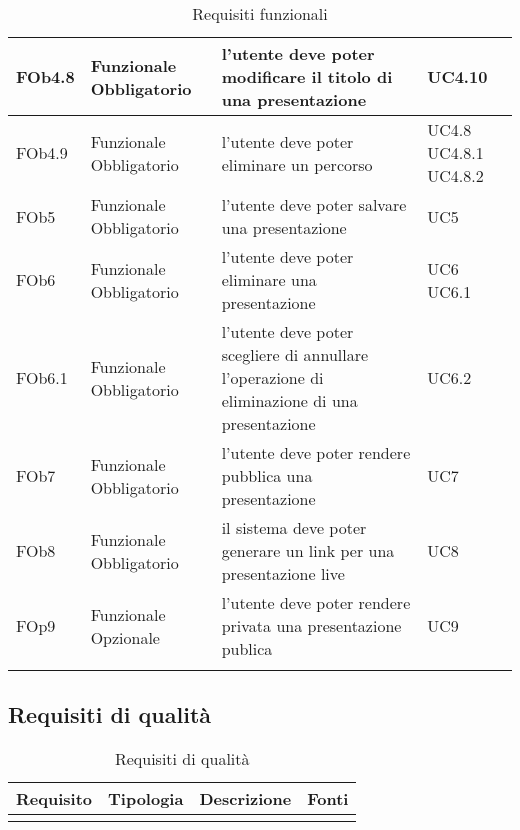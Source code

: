 \begin{longtable}{|l|p{2.5cm}|p{5cm}|p{3.5cm}|}
\hline
FOb4.8 & Funzionale \linebreak Obbligatorio & l'utente deve poter modificare il titolo di una presentazione & UC4.10 \linebreak  \\
\hline
FOb4.9 & Funzionale \linebreak Obbligatorio & l'utente deve poter eliminare un percorso & UC4.8 \linebreak  UC4.8.1 \linebreak  UC4.8.2 \linebreak  \\
\hline
FOb5 & Funzionale \linebreak Obbligatorio & l'utente deve poter salvare una presentazione & UC5 \linebreak \\
\hline
FOb6 & Funzionale \linebreak Obbligatorio & l'utente deve poter eliminare una presentazione & UC6 \linebreak UC6.1 \linebreak \\
\hline
FOb6.1 & Funzionale \linebreak Obbligatorio & l'utente deve poter scegliere di annullare l'operazione di eliminazione di una presentazione & UC6.2 \linebreak  \\
\hline
FOb7 & Funzionale \linebreak Obbligatorio & l'utente deve poter rendere pubblica una presentazione & UC7 \linebreak \\
\hline
FOb8 & Funzionale \linebreak Obbligatorio & il sistema deve poter generare un link per una presentazione live & UC8 \linebreak \\
\hline
FOp9 & Funzionale \linebreak Opzionale & l'utente deve poter rendere privata una presentazione publica & UC9 \linebreak \\
\hline
\caption{Requisiti funzionali}
\end{longtable}
\subsection{ Requisiti di qualità}
	
\begin{longtable}{|l|p{2.5cm}|p{5cm}|p{3.5cm}|}
\hline
\textbf{Requisito} & \textbf{Tipologia} & \textbf{Descrizione} & \textbf{Fonti} \\
\hline
\caption{Requisiti di qualità}
\end{longtable}
